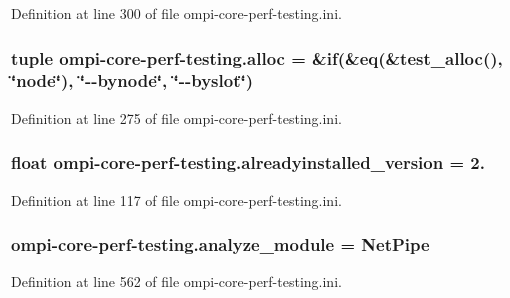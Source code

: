 Definition at line 300 of file ompi-\/core-\/perf-\/testing.\-ini.

\hypertarget{namespaceompi-core-perf-testing_aa210dffd33a5cf9389d7f932dc991a52}{
\subsubsection[{alloc}]{\setlength{\rightskip}{0pt plus 5cm}tuple ompi-\/core-\/perf-\/testing.\-alloc = \&if(\&eq(\&test\-\_\-alloc(), \char`\"{}node\char`\"{}), \char`\"{}-\/-\/bynode\char`\"{}, \char`\"{}-\/-\/byslot\char`\"{})}}\label{namespaceompi-core-perf-testing_aa210dffd33a5cf9389d7f932dc991a52}


Definition at line 275 of file ompi-\/core-\/perf-\/testing.\-ini.

\hypertarget{namespaceompi-core-perf-testing_a0741df34e0d6b86da1d5e8ef8732987d}{
\subsubsection[{alreadyinstalled\-\_\-version}]{\setlength{\rightskip}{0pt plus 5cm}float ompi-\/core-\/perf-\/testing.\-alreadyinstalled\-\_\-version = 2.}}\label{namespaceompi-core-perf-testing_a0741df34e0d6b86da1d5e8ef8732987d}


Definition at line 117 of file ompi-\/core-\/perf-\/testing.\-ini.

\hypertarget{namespaceompi-core-perf-testing_a857540488b9b6bf0c784184a2dbf8a58}{
\subsubsection[{analyze\-\_\-module}]{\setlength{\rightskip}{0pt plus 5cm}ompi-\/core-\/perf-\/testing.\-analyze\-\_\-module = Net\-Pipe}}\label{namespaceompi-core-perf-testing_a857540488b9b6bf0c784184a2dbf8a58}


Definition at line 562 of file ompi-\/core-\/perf-\/testing.\-ini.


